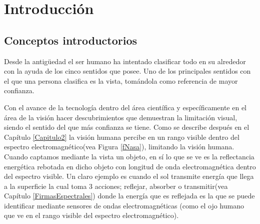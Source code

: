 \chapter{Introducción} %

\label{Capitulo1} %


\newcommand{\keyword}[1]{\textbf{#1}}
\newcommand{\tabhead}[1]{\textbf{#1}}
\newcommand{\code}[1]{\texttt{#1}}
\newcommand{\file}[1]{\texttt{\bfseries#1}}
\newcommand{\option}[1]{\texttt{\itshape#1}}


\section{Conceptos introductorios}

Desde la antigüedad el ser humano ha intentado clasificar todo en su alrededor con la ayuda de los cinco sentidos que posee. Uno de los principales sentidos con el que una persona clasifica es la vista, tomándola como referencia de mayor confianza.

Con el avance de la tecnología dentro del área científica y específicamente en el área de la visión hacer descubrimientos que demuestran la limitación visual, siendo el sentido del que más confianza se tiene. 
Como se describe después en el Capítulo \ref{Capitulo2} la visión humana percibe en un rango visible dentro del espectro electromagnético(vea Figura \ref{fNasa}), limitando la visión humana.
Cuando captamos mediante la vista un objeto, en sí lo que se ve es la reflectancia energética rebotada en dicho objeto con longitud de onda electromagnética dentro del espectro visible. 
Un claro ejemplo es cuando el sol transmite energía que llega a la superficie la cual toma 3 acciones; reflejar, absorber o transmitir(vea Capítulo \ref{FirmasEspectrales}) donde la energía que es reflejada es la que se puede identificar mediante sensores de ondas electromagnéticas (como el ojo humano que ve en el rango visible del espectro electromagnético).

